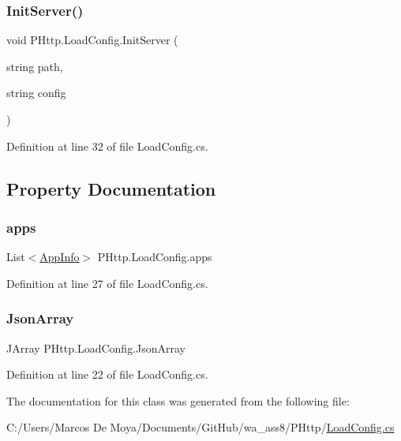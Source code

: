 \subsubsection{\texorpdfstring{Init\+Server()}{InitServer()}}
{\footnotesize\ttfamily void P\+Http.\+Load\+Config.\+Init\+Server (\begin{DoxyParamCaption}\item[{string}]{path,  }\item[{string}]{config }\end{DoxyParamCaption})}



Definition at line 32 of file Load\+Config.\+cs.



\subsection{Property Documentation}
\mbox{\label{class_p_http_1_1_load_config_a5f79616cedb7fe86a95b869384779b1a}} 
\subsubsection{\texorpdfstring{apps}{apps}}
{\footnotesize\ttfamily List$<$\hyperlink{class_p_http_1_1_app_info}{App\+Info}$>$ P\+Http.\+Load\+Config.\+apps\hspace{0.3cm}{\ttfamily [get]}}



Definition at line 27 of file Load\+Config.\+cs.

\mbox{\label{class_p_http_1_1_load_config_af6831370c3d47f652ed39a400860b3f4}} 
\subsubsection{\texorpdfstring{Json\+Array}{JsonArray}}
{\footnotesize\ttfamily J\+Array P\+Http.\+Load\+Config.\+Json\+Array\hspace{0.3cm}{\ttfamily [get]}}



Definition at line 22 of file Load\+Config.\+cs.



The documentation for this class was generated from the following file\+:\begin{DoxyCompactItemize}
\item 
C\+:/\+Users/\+Marcos De Moya/\+Documents/\+Git\+Hub/wa\+\_\+ass8/\+P\+Http/\hyperlink{_load_config_8cs}{Load\+Config.\+cs}\end{DoxyCompactItemize}
